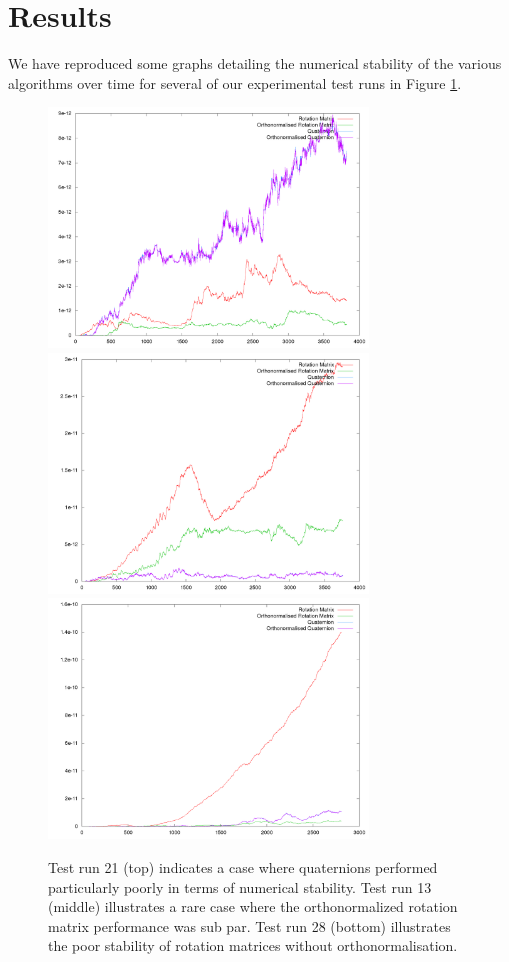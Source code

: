 \documentclass{acm_proc_article-sp}
\begin{document}
\section{Results} 

We have reproduced some graphs detailing the numerical stability of the various algorithms over time for several of our experimental test runs in Figure \ref{fig:stability}.

\begin{figure}[htpb]
\includegraphics[width=8.5cm]{plots/stability_plot_21.png}
\includegraphics[width=8.5cm]{plots/stability_plot_13.png}
\includegraphics[width=8.5cm]{plots/stability_plot_28.png}
\caption{Test run 21 (top) indicates a case where quaternions performed particularly poorly in terms of numerical stability.
Test run 13 (middle) illustrates a rare case where the orthonormalized rotation matrix performance was sub par.
Test run 28 (bottom) illustrates the poor stability of rotation matrices without orthonormalisation.}
\label{fig:stability}
\end{figure}
\end{document}
